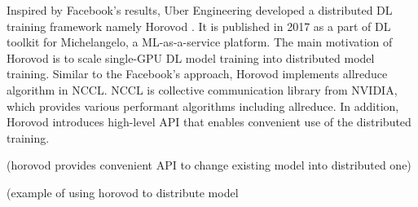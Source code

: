 Inspired by Facebook's results, Uber Engineering developed a distributed DL
training framework namely Horovod \cite{sergeev2018horovod}. It is published in
2017 as a part of DL toolkit for Michelangelo, a ML-as-a-service platform.
The main motivation of Horovod is to scale single-GPU DL model training
into distributed model training. Similar to the Facebook's approach,
Horovod implements allreduce algorithm in NCCL. NCCL is collective communication
library from NVIDIA, which provides various performant algorithms including
allreduce. In addition, Horovod introduces high-level API that enables
convenient use of the distributed training.  

(horovod provides convenient API to change existing model into distributed one)

(example of using horovod to distribute model

